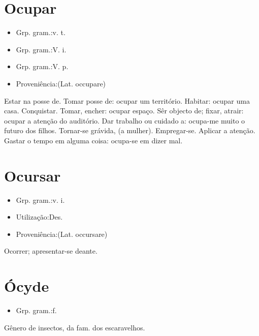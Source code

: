 \section{Ocupar}
\begin{itemize}
\item {Grp. gram.:v. t.}
\end{itemize}
\begin{itemize}
\item {Grp. gram.:V. i.}
\end{itemize}
\begin{itemize}
\item {Grp. gram.:V. p.}
\end{itemize}
\begin{itemize}
\item {Proveniência:(Lat. \textunderscore occupare\textunderscore )}
\end{itemize}
Estar na posse de.
Tomar posse de: \textunderscore ocupar um território\textunderscore .
Habitar: \textunderscore ocupar uma casa\textunderscore .
Conquistar.
Tomar, encher: \textunderscore ocupar espaço\textunderscore .
Sêr objecto de; fixar, atrair: \textunderscore ocupar a atenção do auditório\textunderscore .
Dar trabalho ou cuidado a: \textunderscore ocupa-me muito o futuro dos filhos\textunderscore .
Tornar-se grávida, (a mulher).
Empregar-se.
Aplicar a atenção.
Gastar o tempo em alguma coisa: \textunderscore ocupa-se em dizer mal\textunderscore .
\section{Ocursar}
\begin{itemize}
\item {Grp. gram.:v. i.}
\end{itemize}
\begin{itemize}
\item {Utilização:Des.}
\end{itemize}
\begin{itemize}
\item {Proveniência:(Lat. \textunderscore occursare\textunderscore )}
\end{itemize}
Ocorrer; apresentar-se deante.
\section{Ócyde}
\begin{itemize}
\item {Grp. gram.:f.}
\end{itemize}
Gênero de insectos, da fam. dos escaravelhos.
